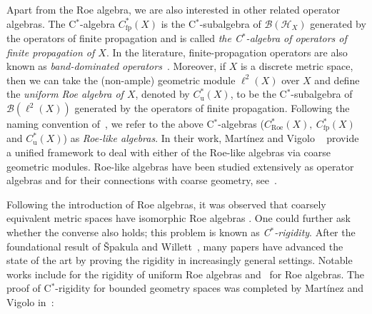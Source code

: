 \documentclass[a4paper]{amsart}
\newcommand{\myhyp}{\textnormal{-}\hskip0pt\relax}
\numberwithin{equation}{section}
\newcommand{\Bcal}{\mathcal{B}}
\newcommand{\Hcal}{\mathcal{H}}
\newcommand{\cstar}{C$^\ast$\myhyp{}algebra}
\newcommand{\cstarSub}{C$^\ast$\myhyp{}subalgebra}
\newcommand{\bop}[1]{\Bcal({#1})}
\newcommand{\Croe}[1]{C^{\ast}_{\mathrm{Roe}}(#1)}
\newcommand{\Cu}[1]{C^{\ast}_{\mathrm{u}}({#1})}
\newcommand{\Cfp}[1]{C^{\ast}_{\mathrm{fp}}({#1})}
\theoremstyle{plain}
\theoremstyle{indented}
\numberwithin{equation}{section}
\theoremstyle{definition}
\theoremstyle{remark}
\theoremstyle{plain}
\theoremstyle{definition}
\begin{document}
Apart from the Roe algebra, we are also interested in other related operator algebras.
The \cstar{} $\Cfp{X}$ is the \cstarSub{} of $\bop{\Hcal_X}$ generated by the operators of finite propagation and is called \emph{the \cstar{} of operators of finite propagation of $X$}. 
In the literature, finite\myhyp{}propagation operators are also known as \emph{band\myhyp{}dominated operators}~\cite{BragaVignati2023GeldandTypeDuality}.
Moreover, if $X$ is a discrete metric space, then 
we can take the (non\myhyp{}ample) geometric module $\ell^2(X)$ over $X$
and define the \emph{uniform Roe algebra of $X$}, denoted by $\Cu{X}$, to be the
\cstarSub{} of $\bop{\ell^2(X)}$ generated by the operators of finite propagation.
Following the naming convention of~\cite{MartinezVigolo2023RoeViaMods},
we refer to the above \cstar{}s (${\Croe{X},~\Cfp{X}}$ and ${\Cu{X}}$) as \emph{Roe\myhyp{}like algebras}. 
In their work, Mart{\'i}nez and Vigolo ~\cite{MartinezVigolo2023RoeViaMods} provide a unified framework 
to deal with either of the Roe\myhyp{}like algebras via coarse geometric modules.
Roe\myhyp{}like algebras have been studied extensively as operator algebras and for their connections with coarse geometry, see~\cite{BaudierBragaFarahKhukhroVignatiWillett2022UniformRoeAlgRigid, KhukhroLiVigoloZhang2021StructureAsymptoticExpanders, Roe2003lecturesCrsGeometry, Sako2014ProperyAandONLPropery,  WhiteWillett2020CartanUniformRoe, Willett2009NotesPropertyA}.



Following the introduction of Roe algebras, it was 
observed
that coarsely equivalent metric spaces have isomorphic Roe algebras \cite{HigsonRoeYu1993CoarseMayerVietoris, Roe1993CoarseCohomologyIndexTheory}. 
One could further ask whether the converse also holds; this problem is known as \emph{C$^\ast$\myhyp{}rigidity}. 
After the foundational result of {\v{S}}pakula and Willett~\cite{SpakulaWillett2013RigidityRoeAlgebras}, 
many papers have advanced the state of the art
by proving the rigidity in increasingly general settings. 
Notable works include 
\cite{BaudierBragaFarahKhukhroVignatiWillett2022UniformRoeAlgRigid,  BragaFarahVignati2020EmbeddingsUniformRoe, BragaFarahVignati2021UniformRoeCoronas, BragaFarahVignati2022GeneralUniformRoeRigidity}
for the rigidity of uniform Roe algebras 
and~\cite{BragaChungLi2020CoarseBaumConnesandRigidity, LiSpakulaZhang2023MeasuredAsymptoticExpandersRigidity} 
for Roe algebras.
The proof of C$^\ast$\myhyp{}rigidity for bounded geometry spaces 
was completed by Mart{\'i}nez and Vigolo in~\cite{MartinezVigolo2025RigidityBoundedGeometry}:
\end{document}
